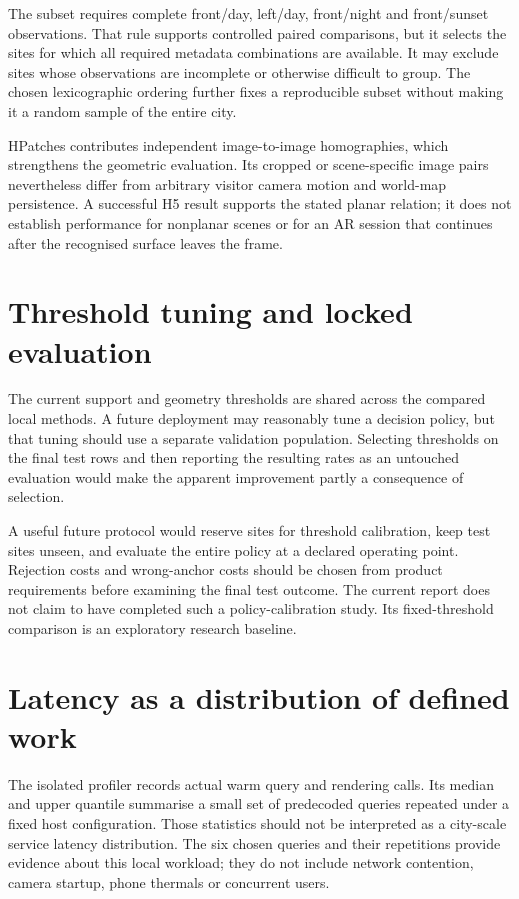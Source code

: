 The subset requires complete front/day, left/day, front/night and front/sunset observations. That rule supports controlled paired comparisons, but it selects the sites for which all required metadata combinations are available. It may exclude sites whose observations are incomplete or otherwise difficult to group. The chosen lexicographic ordering further fixes a reproducible subset without making it a random sample of the entire city.

HPatches contributes independent image-to-image homographies, which strengthens the geometric evaluation. Its cropped or scene-specific image pairs nevertheless differ from arbitrary visitor camera motion and world-map persistence. A successful H5 result supports the stated planar relation; it does not establish performance for nonplanar scenes or for an AR session that continues after the recognised surface leaves the frame.

\section{Threshold tuning and locked evaluation}
The current support and geometry thresholds are shared across the compared local methods. A future deployment may reasonably tune a decision policy, but that tuning should use a separate validation population. Selecting thresholds on the final test rows and then reporting the resulting rates as an untouched evaluation would make the apparent improvement partly a consequence of selection.

A useful future protocol would reserve sites for threshold calibration, keep test sites unseen, and evaluate the entire policy at a declared operating point. Rejection costs and wrong-anchor costs should be chosen from product requirements before examining the final test outcome. The current report does not claim to have completed such a policy-calibration study. Its fixed-threshold comparison is an exploratory research baseline.

\section{Latency as a distribution of defined work}
The isolated profiler records actual warm query and rendering calls. Its median and upper quantile summarise a small set of predecoded queries repeated under a fixed host configuration. Those statistics should not be interpreted as a city-scale service latency distribution. The six chosen queries and their repetitions provide evidence about this local workload; they do not include network contention, camera startup, phone thermals or concurrent users.

